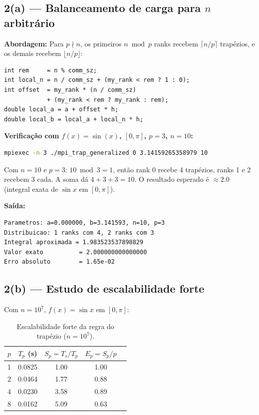 \documentclass[12pt,a4paper]{article}
\begin{document}
\subsection{2(a) — Balanceamento de carga para $n$ arbitrário}

\textbf{Abordagem:} Para $p \nmid n$, os primeiros $n \bmod p$ ranks recebem
$\lceil n/p \rceil$ trapézios, e os demais recebem $\lfloor n/p \rfloor$:

\begin{lstlisting}
int rem     = n % comm_sz;
int local_n = n / comm_sz + (my_rank < rem ? 1 : 0);
int offset  = my_rank * (n / comm_sz)
            + (my_rank < rem ? my_rank : rem);
double local_a = a + offset * h;
double local_b = local_a + local_n * h;
\end{lstlisting}

\textbf{Verificação com $f(x) = \sin(x)$, $[0, \pi]$, $p = 3$, $n = 10$:}
\begin{lstlisting}[language=bash]
mpiexec -n 3 ./mpi_trap_generalized 0 3.14159265358979 10
\end{lstlisting}

Com $n = 10$ e $p = 3$: $10 \bmod 3 = 1$, então rank 0 recebe 4 trapézios,
ranks 1 e 2 recebem 3 cada. A soma dá $4 + 3 + 3 = 10$. O resultado
esperado é $\approx 2.0$ (integral exata de $\sin x$ em $[0, \pi]$).

\textbf{Saída:}
\begin{lstlisting}[numbers=none]
Parametros: a=0.000000, b=3.141593, n=10, p=3
Distribuicao: 1 ranks com 4, 2 ranks com 3
Integral aproximada = 1.983523537898829
Valor exato          = 2.000000000000000
Erro absoluto        = 1.65e-02
\end{lstlisting}

\subsection{2(b) — Estudo de escalabilidade forte}

Com $n = 10^7$, $f(x) = \sin x$ em $[0, \pi]$:

\begin{table}[h]
\centering
\begin{tabular}{@{}rcccc@{}}
\toprule
$p$ & $T_p$ (s) & $S_p = T_s/T_p$ & $E_p = S_p/p$ \\
\midrule
1 & 0.0825 & 1.00 & 1.00 \\
2 & 0.0464 & 1.77 & 0.88 \\
4 & 0.0230 & 3.58 & 0.89 \\
8 & 0.0162 & 5.09 & 0.63 \\
\bottomrule
\end{tabular}
\caption{Escalabilidade forte da regra do trapézio ($n = 10^7$).}
\label{tab:scaling}
\end{table}
\end{document}
